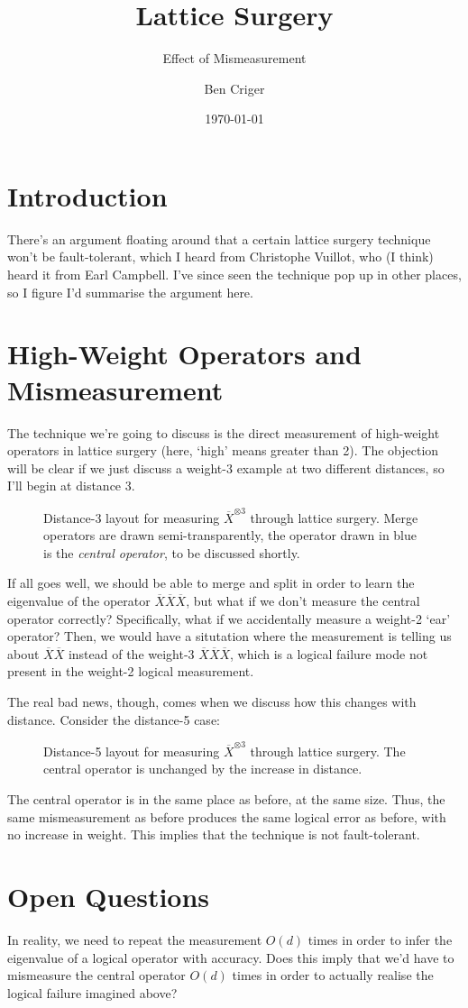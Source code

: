 \documentclass[a4paper, english]{scrartcl}
\title{Lattice Surgery}
\subtitle{Effect of Mismeasurement}
\author{Ben Criger}
\date{\today}
\begin{document}
\maketitle
\section{Introduction}
There's an argument floating around that a certain lattice surgery technique won't be fault-tolerant, which I heard from Christophe Vuillot, who (I think) heard it from Earl Campbell. 
I've since seen the technique pop up in other places, so I figure I'd summarise the argument here. 
\section{High-Weight Operators and Mismeasurement}
The technique we're going to discuss is the direct measurement of high-weight operators in lattice surgery (here, `high' means greater than 2). 
The objection will be clear if we just discuss a weight-3 example at two different distances, so I'll begin at distance 3.
\begin{figure}[!ht]
\centering

\caption{Distance-3 layout for measuring $\overline{X}^{\otimes 3}$ through lattice surgery. 
Merge operators are drawn semi-transparently, the operator drawn in blue is the \emph{central operator}, to be discussed shortly.}
\end{figure}

If all goes well, we should be able to merge and split in order to learn the eigenvalue of the operator $\overline{X} \overline{X} \overline{X}$, but what if we don't measure the central operator correctly? 
Specifically, what if we accidentally measure a weight-2 `ear' operator? 
Then, we would have a situtation where the measurement is telling us about $\overline{X} \overline{X}$ instead of the weight-3 $\overline{X} \overline{X} \overline{X}$, which is a logical failure mode not present in the weight-2 logical measurement. 

\newpage
The real bad news, though, comes when we discuss how this changes with distance. 
Consider the distance-5 case:
\begin{figure}[!ht]
\centering

\caption{Distance-5 layout for measuring $\overline{X}^{\otimes 3}$ through lattice surgery. 
The central operator is unchanged by the increase in distance.}
\end{figure}

The central operator is in the same place as before, at the same size. 
Thus, the same mismeasurement as before produces the same logical error as before, with no increase in weight.
This implies that the technique is not fault-tolerant. 

\section{Open Questions}
In reality, we need to repeat the measurement $O(d)$ times in order to infer the eigenvalue of a logical operator with accuracy. 
Does this imply that we'd have to mismeasure the central operator $O(d)$ times in order to actually realise the logical failure imagined above? 
\end{document}
